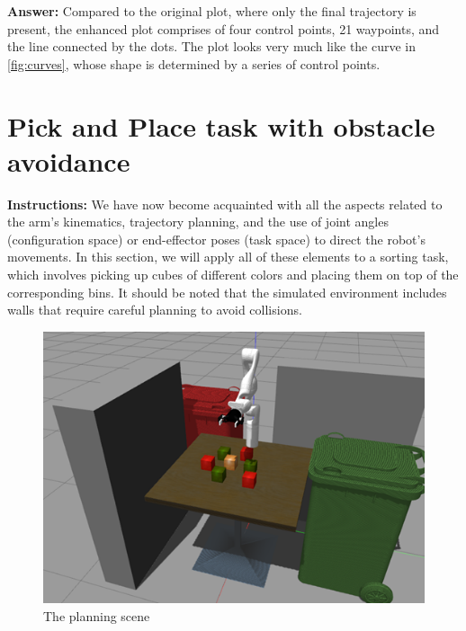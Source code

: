 \documentclass[12pt]{article}
\begin{document}
\begin{enumerate}
    \textbf{Answer: }Compared to the original plot, where only the final trajectory is present, the enhanced plot comprises of four control points, 21 waypoints, and the line connected by the dots. The plot looks very much like the curve in \ref{fig:curves}, whose shape is determined by a series of control points.

\end{enumerate}
    
    

\section{Pick and Place task with obstacle avoidance}

\textbf{Instructions:}
We have now become acquainted with all the aspects related to the arm's kinematics, trajectory planning, and the use of joint angles (configuration space) or end-effector poses (task space) to direct the robot's movements. In this section, we will apply all of these elements to a sorting task, which involves picking up cubes of different colors and placing them on top of the corresponding bins. It should be noted that the simulated environment includes walls that require careful planning to avoid collisions.

\begin{figure}[H]
    \vspace{-10pt}
    \centering\includegraphics[width=12cm]{images/lab73.png}
    \caption{The planning scene}\label{fig:planning}
    \end{figure}
\end{document}
